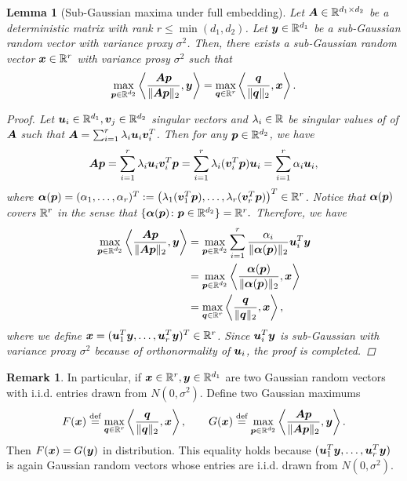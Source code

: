 \documentclass[11pt]{article}
\newtheorem{lem}{Lemma}
\theoremstyle{definition}
\newtheorem{rmk}{Remark}
\begin{document}
\begin{lem}[Sub-Gaussian maxima under full embedding]\label{lem:embedding}
Let $\bm A\in\mathbb{R}^{d_1\times d_2}$ be a deterministic matrix with rank $r\leq\min(d_1,d_2)$. Let $\bm{y}\in\mathbb{R}^{d_1}$ be a sub-Gaussian random vector with variance proxy $\sigma^2$. Then, there exists a sub-Gaussian random vector $\bm x\in\mathbb{R}^r$  with variance prosy $\sigma^2$ such that  
\begin{align}
    \max_{\bm{p}\in\mathbb{R}^{d_2}}\left\langle \frac{\bm A\bm{p}}{\|\bm A\bm{p}\|_2},\bm{y}\right\rangle = \max_{\bm{q}\in\mathbb{R}^r}\left\langle \frac{\bm{q}}{\|\bm{q}\|_2},\bm x\right\rangle.
\end{align}
\begin{proof}
Let $\bm{u}_i\in\mathbb{R}^{d_1},\bm{v}_j\in\mathbb{R}^{d_2}$ singular vectors and $\lambda_i\in\mathbb{R}$ be singular values of of $\bm A$ such that
 $\bm A = \sum_{i=1}^r \lambda_i\bm{u}_i\bm{v}_i^T$.
Then  for any $\bm{p}\in\mathbb{R}^{d_2}$, we have 
\begin{align}
    \bm A\bm{p} = \sum_{i=1}^r\lambda_i \bm{u}_i\bm{v}_i^T\bm{p} = \sum_{i=1}^r \lambda_i(\bm{v}_i^T\bm{p}) \bm{u}_i = \sum_{i = 1}^r \alpha_i\bm{u}_i,
\end{align}
where $\boldsymbol{\alpha}(\bm{p}) = (\alpha_1,\ldots,\alpha_r)^T := \left(\lambda_1(\bm{v}_1^T\bm{p}),\ldots,\lambda_r(\bm{v}_r^T\bm{p})\right)^T\in\mathbb{R}^{r}$. Notice that $\boldsymbol{\alpha}(\bm{p})$ covers $\mathbb{R}^r$ in the sense that $\{\boldsymbol{\alpha}(\bm{p})\colon \bm{p}\in\mathbb{R}^{d_2}\} = \mathbb{R}^r.$
Therefore, we have 
\begin{align}
    \max_{\bm{p}\in\mathbb{R}^{d_2}}\left\langle \frac{\bm A\bm{p}}{\|\bm A\bm{p}\|_2},\bm{y}\right\rangle &=\max_{\bm{p}\in\mathbb{R}^{d_2}}\sum_{i=1}^r\frac{\alpha_i}{\|\boldsymbol{\alpha}(\bm{p})\|_2}\bm{u}_i^T\bm{y}\\&=\max_{\bm{p}\in\mathbb{R}^{d_2}}\left\langle \frac{\boldsymbol{\alpha}(\bm{p})}{\|\boldsymbol{\alpha}(\bm{p})\|_2},\bm x\right\rangle\\&=\max_{\bm{q}\in\mathbb{R}^r}\left\langle \frac{\bm{q}}{\|\bm{q}\|_2},\bm x\right\rangle,
\end{align}
where we define $\bm x = (\bm{u}_1^T\bm{y},\ldots,\bm{u}_r^T\bm{y})^T\in\mathbb{R}^{r}$. Since $\bm{u}_i^T\bm{y}$ is sub-Gaussian with variance proxy $\sigma^2$ because of orthonormality of $\bm{u}_i$, the proof is completed.
\end{proof}
\end{lem}
\begin{rmk} In particular, if $\bm x \in\mathbb{R}^r,\bm{y}\in\mathbb{R}^{d_1}$ are two Gaussian random vectors with i.i.d. entries drawn from $N(0,\sigma^2)$.
Define two Gaussian maximums 
\begin{align}
    F(\bm x)\stackrel{\text{def}}{=}\max_{\bm{q}\in\mathbb{R}^r}\left\langle \frac{\bm{q}}{\|\bm{q}\|_2},\bm x\right\rangle,\quad\quad G(\bm x)\stackrel{\text{def}}{=}\max_{\bm{p}\in\mathbb{R}^{d_2}}\left\langle \frac{\bm A\bm{p}}{\|\bm A\bm{p}\|_2},\bm{y}\right\rangle.
\end{align}
Then $F(\bm x) = G(\bm{y})$ in distribution. This equality holds because $(\bm{u}_1^T\bm{y},\ldots,\bm{u}_r^T\bm{y})$ is again Gaussian random vectors whose entries are i.i.d. drawn from $N(0,\sigma^2).$
\end{rmk}
\end{document}
